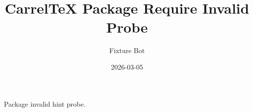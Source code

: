 \documentclass{article}
\title{CarrelTeX Package Require Invalid Probe}
\author{Fixture Bot}
\date{2026-03-05}
\begin{document}
\maketitle

Package invalid hint probe.
\end{document}
